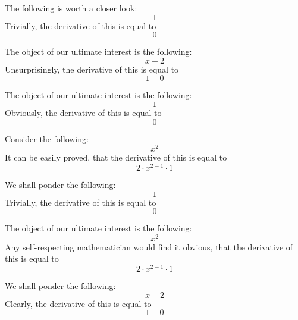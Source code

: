 \documentclass{article}
\begin{document}
The following is worth a closer look:
\begin{equation}
1 
\end{equation}
Trivially, the derivative of this is equal to
\begin{equation}
0 
\end{equation}

The object of our ultimate interest is the following:
\begin{equation}
x - 2 
\end{equation}
Unsurprisingly, the derivative of this is equal to
\begin{equation}
1 - 0 
\end{equation}

The object of our ultimate interest is the following:
\begin{equation}
1 
\end{equation}
Obviously, the derivative of this is equal to
\begin{equation}
0 
\end{equation}

Consider the following:
\begin{equation}
x ^{2 } 
\end{equation}
It can be easily proved, that the derivative of this is equal to
\begin{equation}
2 \cdot x ^{2 - 1 } \cdot 1 
\end{equation}

We shall ponder the following:
\begin{equation}
1 
\end{equation}
Trivially, the derivative of this is equal to
\begin{equation}
0 
\end{equation}

The object of our ultimate interest is the following:
\begin{equation}
x ^{2 } 
\end{equation}
Any self-respecting mathematician would find it obvious, that the derivative of this is equal to
\begin{equation}
2 \cdot x ^{2 - 1 } \cdot 1 
\end{equation}

We shall ponder the following:
\begin{equation}
x - 2 
\end{equation}
Clearly, the derivative of this is equal to
\begin{equation}
1 - 0 
\end{equation}
\end{document}
